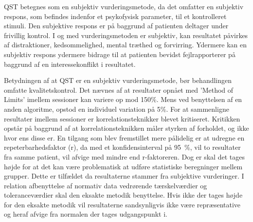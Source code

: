 QST betegnes som en subjektiv vurderingsmetode, da det omfatter en subjektiv respons, som befindes indenfor et psykofysisk parameter, til et kontrolleret stimuli. Den subjektive respons er på baggrund af patienten deltager under frivillig kontrol. \citep{Mucke2016} I og med vurderingsmetoden er subjektiv, kan resultatet påvirkes af distraktioner, kedsommelighed, mental træthed og forvirring. Ydermere kan en subjektiv respons ydermere bidrage til at patienten bevidst fejlrapporterer på baggrund af en interessekonflikt i resultatet. \citep{Yarnitsky2006} 

Betydningen af at QST er en subjektiv vurderingsmetode, bør behandlingen omfatte kvalitetskontrol. Det nævnes af  at resultater opnået med 'Method of Limits' imellem sessioner kan variere op mod 150\%. Mens ved benyttelsen af en anden algoritme, opstod en individuel variation på 5\%. For at sammenligne resultater imellem sessioner er korrelationsteknikker blevet kritiseret. Kritikken opstår på baggrund af at korrelationsteknikken måler styrken af forholdet, og ikke hvor ens disse er. En tilgang som blev fremstillet mere pålidelig er at udregne en repeterbarhedsfaktor (r), da med et konfidensinterval på 95~\%, vil to resultater fra samme patient, vil afvige med mindre end r-faktoreren. Dog er skal det tages højde for at det kan være problematisk at udføre statistiske beregninger mellem grupper. Dette er tilfældet da resultaterne stammer fra subjektive vurderinger. \citep{Zaslansky1998} I relation afbenyttelse af normativ data vedrørende tærskelværdier og toleranceværdier skal den eksakte metodik benyttelse. Hvis ikke der tages højde for den eksakte metodik vil resultaterne sandsynligvis ikke være repræsentative og heraf afvige fra normalen der tages udgangspunkt i. \citep{Yarnitsky1997}

